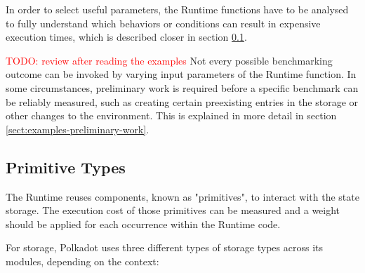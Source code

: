 \documentclass[11pt,a4paper]{article}
\newcommand{\todo}[1]{\textcolor{red}{TODO: #1}}
\begin{document}
In order to select useful parameters, the Runtime functions have to be analysed
to fully understand which behaviors or conditions can result in expensive
execution times, which is described closer in section
\ref{sect:primitive-types}.

\todo{review after reading the examples} Not every possible benchmarking outcome
can be invoked by varying input parameters of the Runtime function. In some
circumstances, preliminary work is required before a specific benchmark can be
reliably measured, such as creating certain preexisting entries in the storage
or other changes to the environment. This is explained in more detail in section
\ref{sect:examples-preliminary-work}.
\newpage

\subsection{Primitive Types}\label{sect:primitive-types}
The Runtime reuses components, known as "primitives", to interact with the state
storage. The execution cost of those primitives can be measured and a weight
should be applied for each occurrence within the Runtime code.
\newline

For storage, Polkadot uses three different types of storage types across its
modules, depending on the context:
\end{document}
